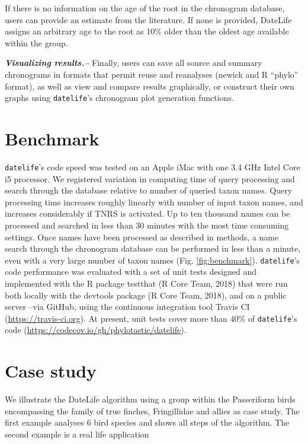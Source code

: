 \documentclass[
  english,
  man]{apa6}
\begin{document}
If there is no information on the age of the root in the chronogram database, users can provide an estimate from the literature. If none is provided, DateLife assigns an arbitrary age to the root as 10\% older than the oldest age available within the group.

\emph{\textbf{Visualizing results.--}}
Finally, users can save all source and summary chronograms in formats that permit reuse and reanalyses (newick and R ``phylo'' format), as well as view and compare results graphically, or construct their own graphs using \texttt{datelife}'s chronogram plot generation functions.

\hypertarget{benchmark}{%
\section{Benchmark}\label{benchmark}}

\texttt{datelife}'s code speed was tested on an Apple iMac
with one 3.4 GHz Intel Core i5 processor.
We registered variation in computing time of query processing and search through the database relative to number of queried taxon names.
Query processing time increases roughly linearly with number of input taxon names, and
increases considerably if TNRS is activated.
Up to ten thousand names can be processed and searched in less than 30 minutes with the most time consuming settings.
Once names have been processed as described in methods, a name search through the chronogram database can be performed in less than a minute, even with a very large number of taxon names (Fig. \ref{fig:benchmark}).
\texttt{datelife}'s code performance was evaluated with a set of unit tests designed and
implemented with the R package testthat (R Core Team, 2018) that were run both locally
with the devtools package (R Core Team, 2018), and on a public server --via
GitHub, using the continuous integration tool Travis CI (\url{https://travis-ci.org}). At
present, unit tests cover more than 40\% of \texttt{datelife}'s code (\url{https://codecov.io/gh/phylotastic/datelife}).

\hypertarget{case-study}{%
\section{Case study}\label{case-study}}

We illustrate the DateLife algorithm using a group within the Passeriform birds encompassing the family of true finches, Fringillidae and allies as case study. The first example analyses 6 bird species and shows all steps of the algorithm. The second example is a real life application
\end{document}
